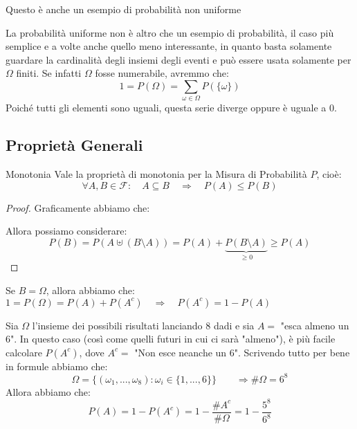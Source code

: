 \documentclass[11pt, a4paper, twoside]{article}
\begin{document}
Questo è anche un esempio di probabilità non uniforme

\begin{oss}
	La probabilità uniforme non è altro che un esempio di probabilità, il caso più semplice e a volte anche quello meno interessante, in quanto basta solamente guardare la cardinalità degli insiemi degli eventi e può essere usata solamente per $\Omega$ finiti. Se infatti $\Omega$ fosse numerabile, avremmo che:
	\[ 1 = P(\Omega) = \sum_{\omega \in \Omega}P(\{\omega\}) \]
	Poiché tutti gli elementi sono uguali, questa serie diverge oppure è uguale a $0$.
\end{oss}

\subsection{Proprietà Generali}

\begin{prop}{Monotonia}{}\label{Monotonia}
	Vale la proprietà di monotonia per la Misura di Probabilità $P$, cioè:
	\[ \forall A,B \in \mathcal F: \quad A \subseteq B \quad \Rightarrow \quad P(A)\leq P(B) \]
\end{prop}
\begin{proof} %
	Graficamente abbiamo che:
	\begin{center}
	\end{center}
	Allora possiamo considerare:
	\[ P(B) = P(A \uplus (B\setminus A)) = P(A) + \underbrace{P(B\setminus A)}_{\geq 0} \geq P(A) \]
\end{proof}

\begin{oss}
	Se $B = \Omega$, allora abbiamo che:
	$1= P(\Omega) = P(A) + P(A^c) \quad \Rightarrow \quad P(A^c) = 1-P(A)$
\end{oss}

\begin{es}
	Sia $\Omega$ l'insieme dei possibili risultati lanciando $8$ dadi e sia $A= $ "esca almeno un $6$". In questo caso (così come quelli futuri in cui ci sarà "almeno"), è più facile calcolare $P(A^c)$, dove $A^c =$ "Non esce neanche un $6$". Scrivendo tutto per bene in formule abbiamo che:
	\[ \Omega = \{(\omega_1,...,\omega_8): \omega_i \in \{1,...,6\}\} \qquad \Rightarrow \# \Omega = 6^8\]
	Allora abbiamo che:
	\[ P(A) = 1-P(A^c) = 1 - \frac{\# A^c}{\# \Omega} = 1 - \frac{5^8}{6^8} \]
\end{es}
\end{document}
